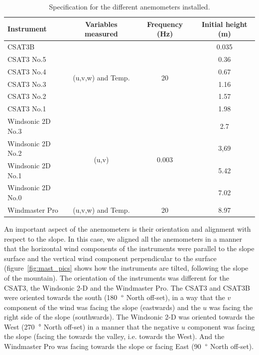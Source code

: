 \begin{table}[!ht]
    \centering
    \begin{tabular}{ | l | c | c | c |}
    \hline
    \textbf{Instrument} & \textbf{Variables measured} &  \textbf{Frequency (Hz)} & \textbf{Initial height (m)} \\ [0.5ex]  \hline\hline
    CSAT3B & \multirow{6}{*}{(u,v,w) and Temp.} & \multirow{6}{*}{20} & 0.035 \\
    CSAT3 No.5 &  &  & 0.36 \\
    CSAT3 No.4 &  &  & 0.67 \\
    CSAT3 No.3 &  &  & 1.16 \\
    CSAT3 No.2 &  &  & 1.57 \\
    CSAT3 No.1 &  &  & 1.98 \\
    \hline
    Windsonic 2D No.3 & \multirow{4}{*}{(u,v)} & \multirow{4}{*}{0.003} &  2.7\\
    Windsonic 2D No.2 &  &  &  3,69\\
    Windsonic 2D No.1 &  &  &  5.42\\
    Windsonic 2D No.0 &  &  &  7.02\\
    \hline
    Windmaster Pro & (u,v,w) and Temp. & 20 & 8.97 \\
    \hline
    
    \end{tabular}
    \caption{Specification for the different anemometers installed.}
    \label{tab:intruments_anemometers}
\end{table}

An important aspect of the anemometers is their orientation and alignment with respect to the slope. In this case, we aligned all the anemometers in a manner that the horizontal wind components of the instruments were parallel to the slope surface and the vertical wind component perpendicular to the surface (figure~\ref{fig:mast_pics} shows how the instruments are tilted, following the slope of the mountain). The orientation of the instruments was different for the CSAT3, the Windsonic 2-D and the Windmaster Pro. The CSAT3 and CSAT3B were oriented towards the south (180~$\degree$ North off-set), in a way that the $v$ component of the wind was facing the slope (eastwards) and the $u$ was facing the right side of the slope (southwards). The Windsonic 2-D was oriented towards the West (270~$\degree$ North off-set) in a manner that the negative $u$ component was facing the slope (facing the towards the valley, i.e. towards the West). And the Windmaster Pro was facing towards the slope or facing East (90~$\degree$ North off-set).


